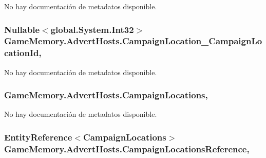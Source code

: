No hay documentación de metadatos disponible. 

\hypertarget{class_game_memory_1_1_advert_hosts_afa83e1eed2d680e2b5025fc5a79562dc}{
\subsubsection[{Campaign\-Location\-\_\-\-Campaign\-Location\-Id}]{\setlength{\rightskip}{0pt plus 5cm}Nullable$<$global.\-System.\-Int32$>$ Game\-Memory.\-Advert\-Hosts.\-Campaign\-Location\-\_\-\-Campaign\-Location\-Id\hspace{0.3cm}{\ttfamily [get]}, {\ttfamily [set]}}}\label{class_game_memory_1_1_advert_hosts_afa83e1eed2d680e2b5025fc5a79562dc}


No hay documentación de metadatos disponible. 

\hypertarget{class_game_memory_1_1_advert_hosts_ab5cafcddf70eae65c6848c168af5a4e5}{
\subsubsection[{Campaign\-Locations}]{ Game\-Memory.\-Advert\-Hosts.\-Campaign\-Locations\hspace{0.3cm}{\ttfamily [get]}, {\ttfamily [set]}}}\label{class_game_memory_1_1_advert_hosts_ab5cafcddf70eae65c6848c168af5a4e5}


No hay documentación de metadatos disponible. 

\hypertarget{class_game_memory_1_1_advert_hosts_adde1f5e205d40e2b0893edd68382747a}{
\subsubsection[{Campaign\-Locations\-Reference}]{\setlength{\rightskip}{0pt plus 5cm}Entity\-Reference$<${\bf Campaign\-Locations}$>$ Game\-Memory.\-Advert\-Hosts.\-Campaign\-Locations\-Reference\hspace{0.3cm}{\ttfamily [get]}, {\ttfamily [set]}}}\label{class_game_memory_1_1_advert_hosts_adde1f5e205d40e2b0893edd68382747a}


